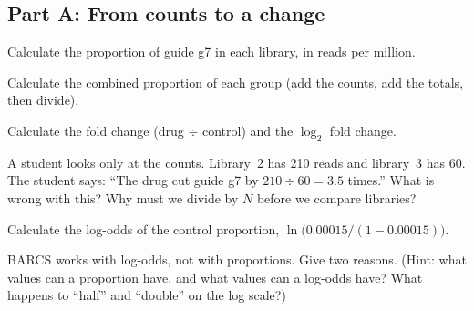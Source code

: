\subsection*{Part A: From counts to a change}
\begin{exlist}[series=ex1]
\item \tagcalc
\begin{parts}
\item Calculate the proportion of guide g7 in each library, in reads per
  million.
\item Calculate the combined proportion of each group (add the counts, add
  the totals, then divide).
\item Calculate the fold change (drug $\div$ control) and the $\log_2$
  fold change.
\end{parts}

\item \tagexplain{} A student looks only at the counts. Library~2 has 210
reads and library~3 has 60. The student says: ``The drug cut guide g7 by
$210 \div 60 = 3.5$ times.'' What is wrong with this? Why must we divide by
$N$ before we compare libraries?

\item \tagcalc{} \tagexplain
\begin{parts}
\item Calculate the log-odds of the control proportion,
  $\ln\bigl(0.00015 / (1 - 0.00015)\bigr)$.
\item BARCS works with log-odds, not with proportions. Give two reasons.
  (Hint: what values can a proportion have, and what values can a log-odds
  have? What happens to ``half'' and ``double'' on the log scale?)
\end{parts}
\end{exlist}

